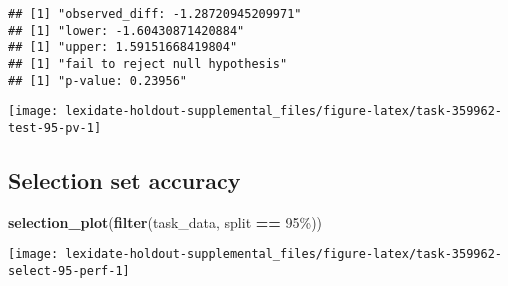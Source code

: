 \documentclass[
]{book}
\newenvironment{Shaded}{\begin{snugshade}}{\end{snugshade}}
\newcommand{\AttributeTok}[1]{\textcolor[rgb]{0.13,0.29,0.53}{#1}}
\newcommand{\DecValTok}[1]{\textcolor[rgb]{0.00,0.00,0.81}{#1}}
\newcommand{\FunctionTok}[1]{\textcolor[rgb]{0.13,0.29,0.53}{\textbf{#1}}}
\newcommand{\NormalTok}[1]{#1}
\newcommand{\OtherTok}[1]{\textcolor[rgb]{0.56,0.35,0.01}{#1}}
\newcommand{\SpecialCharTok}[1]{\textcolor[rgb]{0.81,0.36,0.00}{\textbf{#1}}}
\newcommand{\StringTok}[1]{\textcolor[rgb]{0.31,0.60,0.02}{#1}}
\begin{document}
\begin{Shaded}
\end{Shaded}

\begin{verbatim}
## [1] "observed_diff: -1.28720945209971"
## [1] "lower: -1.60430871420884"
## [1] "upper: 1.59151668419804"
## [1] "fail to reject null hypothesis"
## [1] "p-value: 0.23956"
\end{verbatim}

\texttt{[image: lexidate-holdout-supplemental\_files/figure-latex/task-359962-test-95-pv-1]}

\hypertarget{selection-set-accuracy-59}{%
\subsection{Selection set accuracy}\label{selection-set-accuracy-59}}

\begin{Shaded}
\begin{Highlighting}[]
\FunctionTok{selection\_plot}\NormalTok{(}\FunctionTok{filter}\NormalTok{(task\_data, split }\SpecialCharTok{==} \StringTok{\textquotesingle{}95\%\textquotesingle{}}\NormalTok{))}
\end{Highlighting}
\end{Shaded}

\texttt{[image: lexidate-holdout-supplemental\_files/figure-latex/task-359962-select-95-perf-1]}
\end{document}
